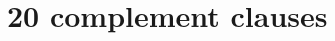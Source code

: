\documentclass[11pt,fleqn]{article}
\newcommand{\6}{\mbox{$[\hspace*{-.6mm}[$}}
\newcommand{\9}{\mbox{$]\hspace*{-.6mm}]$}}
\begin{document}
%
%
%
%
%
%
%
%
%
%
%

\section{20 complement clauses}\label{a-clauses}
\end{document}
